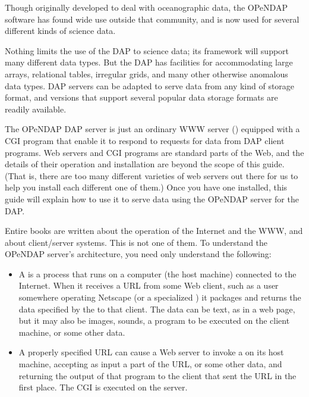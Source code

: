 \documentclass{dods-book}
\begin{document}
Though originally developed to deal with oceanographic data, the
OPeNDAP software has found wide use outside that community, and is now
used for several different kinds of science data.

Nothing limits the use of the DAP to science data; its framework will
support many different data types. But the DAP has facilities for
accommodating large arrays, relational tables, irregular grids, and
many other otherwise anomalous data types. DAP servers can be adapted
to serve data from any kind of storage format, and versions that
support several popular data storage formats are readily available.


The OPeNDAP DAP server is just an ordinary WWW server
() equipped with a CGI program
that enable it to respond to requests for data from DAP client
programs. Web servers and CGI programs are standard parts of the Web,
and the details of their operation and  installation are
beyond the scope of this guide. (That is, there are too many different
varieties of web servers out there for us to help you install each
different one of them.) Once you have one installed, this guide will
explain how to use it to serve data using the OPeNDAP server for the
DAP.

Entire books are written about the operation of the Internet and the
WWW, and about client/server systems. This is not one of them. To
understand the OPeNDAP server's architecture, you need only understand
the following:

\begin{itemize}
  
\item A  is a process that runs on a computer (the
  host machine) connected to the Internet. When it receives a URL from
  some Web client, such as a user somewhere operating Netscape (or a
  specialized ) it packages and returns the data
  specified by the  to that client. The data can be text, as
  in a web page, but it may also be images, sounds, a program to be
  executed on the client machine, or some other data.
  
\item A properly specified URL can cause a Web server to invoke a
   on its host machine, accepting as input a part of
  the URL, or some other data, and returning the output of that
  program to the client that sent the URL in the first place. The CGI
  is executed on the server.

\end{itemize}
\end{document}
